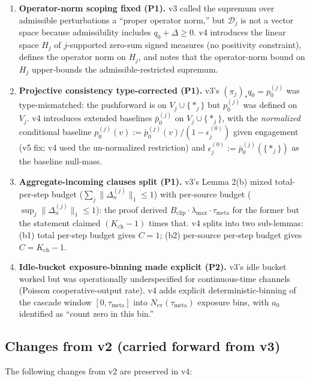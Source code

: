 \documentclass{article}
\newcommand{\Bclip}{B_{\mathrm{clip}}}
\newcommand{\Kch}{K_{\mathrm{ch}}}
\newcommand{\Nev}{N_{\mathrm{ev}}}
\newcommand{\lammax}{\lambda_{\max}}
\newcommand{\taumeta}{\tau_{\mathrm{meta}}}
\begin{document}
\begin{enumerate}
\item \textbf{Operator-norm scoping fixed (P1).} v3 called the
  supremum over admissible perturbations a ``proper operator
  norm,'' but $\mathcal{D}_j$ is not a vector space because
  admissibility includes $q_0 + \Delta \geq 0$.  v4 introduces the
  linear space $H_j$ of $j$-supported zero-sum signed measures
  (no positivity constraint), defines the operator norm on $H_j$,
  and notes that the operator-norm bound on $H_j$ upper-bounds
  the admissible-restricted supremum.

\item \textbf{Projective consistency type-corrected (P1).} v3's
  $(\pi_j)_* q_0 = p_0^{(j)}$ was type-mismatched: the pushforward
  is on $V_j \cup \{*_j\}$ but $p_0^{(j)}$ was defined on $V_j$.
  v4 introduces extended baselines $\bar{p}_0^{(j)}$ on $V_j \cup
  \{*_j\}$, with the \emph{normalized} conditional baseline
  $p_0^{(j)}(v) := \bar{p}_0^{(j)}(v)/(1 - \epsilon_j^{(0)})$
  given engagement (v5 fix; v4 used the un-normalized restriction)
  and $\epsilon_j^{(0)} := \bar{p}_0^{(j)}(\{*_j\})$ as the
  baseline null-mass.

\item \textbf{Aggregate-incoming clauses split (P1).} v3's Lemma
  2(b) mixed total-per-step budget ($\sum_j \|\Delta_n^{(j)}\|_1
  \leq 1$) with per-source budget ($\sup_j \|\Delta_n^{(j)}\|_1
  \leq 1$): the proof derived $\Bclip \cdot \lammax \cdot \taumeta$
  for the former but the statement claimed $(\Kch - 1)$ times that.
  v4 splits into two sub-lemmas: (b1) total per-step budget gives
  $C = 1$; (b2) per-source per-step budget gives $C = \Kch - 1$.

\item \textbf{Idle-bucket exposure-binning made explicit (P2).}
  v3's idle bucket worked but was operationally underspecified for
  continuous-time channels (Poisson cooperative-output rate).  v4
  adds explicit deterministic-binning of the cascade window
  $[0, \taumeta]$ into $\Nev(\taumeta)$ exposure bins, with $a_0$
  identified as ``count zero in this bin.''
\end{enumerate}

\subsection{Changes from v2 (carried forward from v3)}

The following changes from v2 are preserved in v4:
\end{document}
